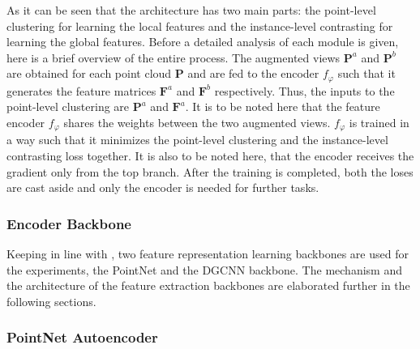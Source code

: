  As it can be seen that the architecture has two main parts: the point-level clustering for learning the local features and the instance-level contrasting for learning the global features. Before a detailed analysis of each module is given, here is a brief overview of the entire process. The augmented views $\mathcal{\textbf{P}}^a$ and $\mathcal{\textbf{P}}^b$ are obtained for each point cloud $\mathcal{\textbf{P}}$ and are fed to the encoder $f_{\varphi}$ such that it generates the feature matrices $\mathcal{\textbf{F}}^a$ and $\mathcal{\textbf{F}}^b$ respectively. Thus, the inputs to the point-level clustering are $\mathcal{\textbf{P}}^a$ and $\mathcal{\textbf{F}}^a$. It is to be noted here that the feature encoder $f_{\varphi}$ shares the weights between the two augmented views. $f_{\varphi}$ is trained in a way such that it minimizes the point-level clustering and the instance-level contrasting loss together. It is also to be noted here, that the encoder receives the gradient only from the top branch. After the training is completed, both the loses are cast aside and only the encoder is needed for further tasks.\cite{mei2022unsupervised}

\subsubsection{Encoder Backbone}
Keeping in line with \cite{mei2022unsupervised}, two feature representation learning backbones are used for the experiments, the PointNet \cite{qi2017pointnet} and the \ac{DGCNN} \cite{wang2019dynamic} backbone. The mechanism and the architecture of the feature extraction backbones are elaborated further in the following sections.
\subsubsection*{PointNet Autoencoder}

